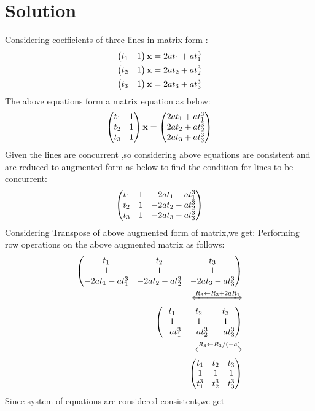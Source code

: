 \documentclass[journal,12pt,twocolumn]{IEEEtran}
\begin{document}
\section*{\textbf{Solution}}
\noindent
Considering coefficients of three lines in matrix form :
\begin{align}
\begin{pmatrix}t_1&1\end{pmatrix}\mathbf{x}=2at_1+at_1^3\\
\begin{pmatrix}t_2&1\end{pmatrix}\mathbf{x}=2at_2+at_2^3\\
\begin{pmatrix}t_3&1\end{pmatrix}\mathbf{x}=2at_3+at_3^3
\end{align}
The above equations form a matrix equation as below:
\begin{align}
\begin{pmatrix}t_1&1\\t_2&1\\t_3&1\end{pmatrix}\mathbf{x}=\begin{pmatrix}2at_1+at_1^3\\2at_2+at_2^3\\2at_3+at_3^3\end{pmatrix}
\end{align}
Given the lines are concurrent ,so considering above equations are consistent and are reduced to augmented form as below to find the condition for lines to be concurrent:
\begin{align}
\begin{pmatrix}
t_1&1&-2at_1-at_1^3\\
t_2&1&-2at_2-at_2^3\\
t_3&1&-2at_3-at_3^3
\end{pmatrix}
\end{align}
Considering Transpose of above augmented form of matrix,we get:
Performing row operations on the above augmented matrix as follows:
\begin{align}
\begin{split}
\begin{pmatrix}t_1&t_2&t_3\\1&1&1\\-2at_1-at_1^3&-2at_2-at_2^3&-2at_3-at_3^3
\end{pmatrix}\\
\xleftrightarrow{R_3\leftarrow {R_3+2aR_1}}\\  
\begin{pmatrix}t_1&t_2&t_3\\1&1&1\\-at_1^3&-at_2^3&-at_3^3\end{pmatrix}\\
\xleftrightarrow{R_3 \leftarrow {R_3/(-a)}}\\
\begin{pmatrix}t_1&t_2&t_3\\1&1&1\\t_1^3&t_2^3&t_3^3\end{pmatrix}
\end{split}
\end{align}
Since system of equations are considered consistent,we get
\end{document}
